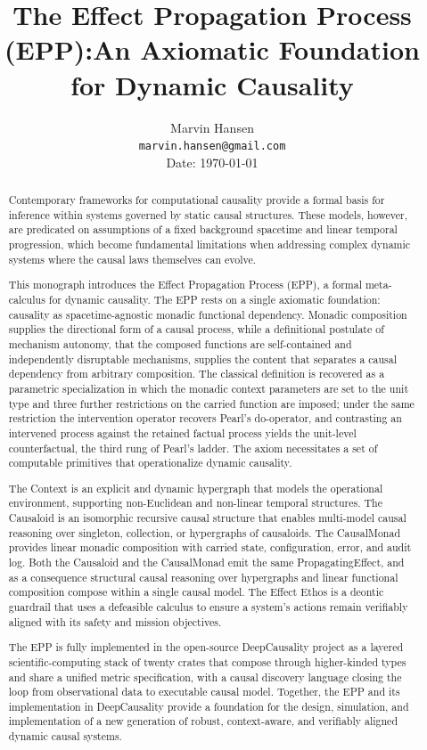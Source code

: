 \documentclass{article}
\title{The Effect Propagation Process (EPP):\newline An Axiomatic Foundation for Dynamic Causality}
\author{
    Marvin Hansen \\
    \texttt{marvin.hansen@gmail.com} \\
    Date: \today
}
\begin{document}
    \maketitle

    \begin{abstract}
        Contemporary frameworks for computational causality provide a formal basis for inference within systems governed by static causal structures. These models, however, are predicated on assumptions of a fixed background spacetime and linear temporal progression, which become fundamental limitations when addressing complex dynamic systems where the causal laws themselves can evolve.

        This monograph introduces the Effect Propagation Process (EPP), a formal meta-calculus for dynamic causality. The EPP rests on a single axiomatic foundation: causality as spacetime-agnostic monadic functional dependency. Monadic composition supplies the directional form of a causal process, while a definitional postulate of mechanism autonomy, that the composed functions are self-contained and independently disruptable mechanisms, supplies the content that separates a causal dependency from arbitrary composition. The classical definition is recovered as a parametric specialization in which the monadic context parameters are set to the unit type and three further restrictions on the carried function are imposed; under the same restriction the intervention operator recovers Pearl's do-operator, and contrasting an intervened process against the retained factual process yields the unit-level counterfactual, the third rung of Pearl's ladder. The axiom necessitates a set of computable primitives that operationalize dynamic causality.

        The Context is an explicit and dynamic hypergraph that models the operational environment, supporting non-Euclidean and non-linear temporal structures. The Causaloid is an isomorphic recursive causal structure that enables multi-model causal reasoning over singleton, collection, or hypergraphs of causaloids.
        The CausalMonad provides linear monadic composition with carried state, configuration, error, and audit log. Both the Causaloid and the CausalMonad emit the same PropagatingEffect, and as a consequence structural causal reasoning over hypergraphs and linear functional composition compose within a single causal model. The Effect Ethos is a deontic guardrail that uses a defeasible calculus to ensure a system's actions remain verifiably aligned with its safety and mission objectives.

        The EPP is fully implemented in the open-source DeepCausality project as a layered scientific-computing stack of twenty crates that compose through higher-kinded types and share a unified metric specification, with a causal discovery language closing the loop from observational data to executable causal model. Together, the EPP and its implementation in DeepCausality provide a foundation for the design, simulation, and implementation of a new generation of robust, context-aware, and verifiably aligned dynamic causal systems.
    \end{abstract}
\end{document}
